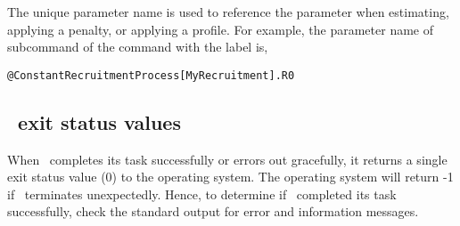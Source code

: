 The unique parameter name is used to reference the parameter when estimating, applying a penalty, or applying a profile. For example, the parameter name of subcommand  of the command  with the label  is,

\texttt{@ConstantRecruitmentProcess[MyRecruitment].R0}

\subsection{\SPM\ exit status values}

When \SPM\ completes its task successfully or errors out gracefully, it returns a single exit status value (0) to the operating system. The operating system will return -1 if \SPM\ terminates unexpectedly. Hence, to determine if \SPM\ completed its task successfully, check the standard output for error and information messages.
